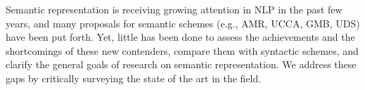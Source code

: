 Semantic representation is receiving growing attention in NLP in the past few years, and many proposals for semantic schemes (e.g., AMR, UCCA, GMB, UDS) have been put forth. Yet, little has been done to assess the achievements and the shortcomings of these new contenders, compare them with syntactic schemes, and clarify the general goals of research on semantic representation. We address these gaps by critically surveying the state of the art in the field.
